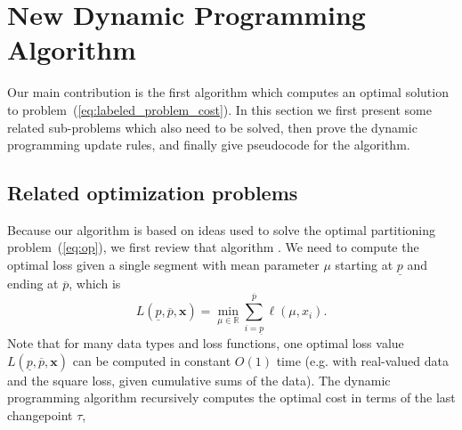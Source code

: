 \documentclass[12pt]{article}
\begin{document}
\section{New Dynamic Programming Algorithm}

Our main contribution is the first algorithm which computes an optimal solution to problem~(\ref{eq:labeled_problem_cost}). In this section we first present some related sub-problems which also need to be solved, then prove the dynamic programming update rules, and finally give pseudocode for the algorithm.

\subsection{Related optimization problems}

Because our algorithm is based on ideas used to solve the optimal partitioning problem~(\ref{eq:op}), we first review that algorithm \citep{Jackson2005}. We need to compute the optimal loss given a single segment with mean parameter $\mu$ starting at $\underline p$ and ending at $\overline p$, which is 
\begin{equation}
    \label{eq:L}
L(\underline p, \overline p, \mathbf x) = 
    \min_{\mu\in\mathbb R}
    \sum_{i=\underline p}^{\overline p}
    \ell(\mu, x_i).
\end{equation}
Note that for many data types and loss functions, one optimal loss value $L(\underline p, \overline p, \mathbf x)$ can be computed in constant $O(1)$ time (e.g. with real-valued data and the square loss, given cumulative sums of the data). 
The dynamic programming algorithm recursively computes the optimal cost in terms of the last changepoint $\tau$,
\end{document}

